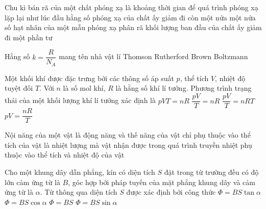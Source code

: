 	\begin{ex}%
		Chu kì bán rã của một chất phóng xạ là khoảng thời gian để
		\choice
		{quá trình phóng xạ lặp lại như lúc đầu}
		{hằng số phóng xạ của chất ấy giảm đi còn một nửa}
		{\True một nửa số hạt nhân của một mẫu phóng xạ phân rã}
		{khối lượng ban đầu của chất ấy giảm đi một phần tư}
	\end{ex}

	\begin{ex}%
		Hằng số $k=\dfrac{R}{N_A}$ mang tên nhà vật lí
		\choice
		{Thomson}
		{Rutherford}
		{Brown}
		{\True Boltzmann}
	\end{ex}

	\begin{ex}%
		Một khối khí được đặc trưng bởi các thông số áp suất $p$, thể tích $V$, nhiệt độ tuyệt đối $T$. Với $n$ là số mol khí, $R$ là hằng số khí lí tưởng. Phương trình trạng thái của một khối lượng khí lí tưởng xác định là
		\choice
		{$pVT=nR$}
		{\True $\dfrac{pV}{T}=nR$}
		{$\dfrac{pV}{T}=nRT$}
		{$pV=\dfrac{nR}{T}$}
	\end{ex}

	\begin{ex}%
		Nội năng của một vật
		\choice
		{là động năng và thế năng của vật}
		{chỉ phụ thuộc vào thể tích của vật}
		{là nhiệt lượng mà vật nhận được trong quá trình truyền nhiệt}
		{\True phụ thuộc vào thể tích và nhiệt độ của vật}
	\end{ex}

	\begin{ex}%
		Cho một khung dây dẫn phẳng, kín có diện tích $S$ đặt trong từ trường đều có độ lớn cảm ứng từ là $B$, góc hợp bởi pháp tuyến của mặt phẳng khung dây và cảm ứng từ là $\alpha$. Từ thông qua diện tích $S$ được xác định bởi công thức
		\choice
		{$\Phi=BS\tan\alpha$}
		{\True $\Phi=BS\cos\alpha$}
		{$\Phi=BS$}
		{$\Phi=BS\sin\alpha$}
	\end{ex}

